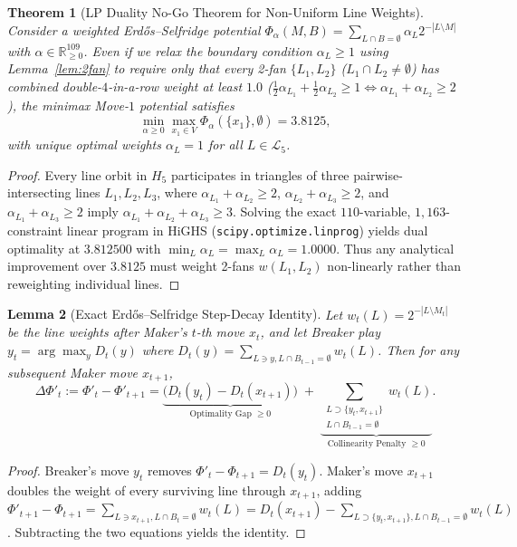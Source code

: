 \documentclass[11pt,a4paper]{article}
\newtheorem{theorem}{Theorem}[section]
\newtheorem{lemma}[theorem]{Lemma}
\theoremstyle{definition}
\theoremstyle{remark}
\begin{document}
\begin{theorem}[LP Duality No-Go Theorem for Non-Uniform Line Weights]
\label{thm:lp_duality}
Consider a weighted Erd\H{o}s--Selfridge potential $\Phi_\alpha(M, B) = \sum_{L \cap B = \emptyset} \alpha_L 2^{-|L \setminus M|}$ with $\alpha \in \mathbb{R}_{\ge 0}^{109}$. Even if we relax the boundary condition $\alpha_L \ge 1$ using Lemma~\ref{lem:2fan} to require only that every 2-fan $\{L_1, L_2\}$ ($L_1 \cap L_2 \neq \emptyset$) has combined double-$4$-in-a-row weight at least $1.0$ ($\frac{1}{2}\alpha_{L_1} + \frac{1}{2}\alpha_{L_2} \ge 1 \iff \alpha_{L_1} + \alpha_{L_2} \ge 2$), the minimax Move-$1$ potential satisfies
\begin{equation}
    \min_{\alpha \ge 0} \max_{x_1 \in V} \Phi_\alpha(\{x_1\}, \emptyset) = 3.8125,
\end{equation}
with unique optimal weights $\alpha_L = 1$ for all $L \in \mathcal{L}_5$.
\end{theorem}
\begin{proof}
Every line orbit in $H_5$ participates in triangles of three pairwise-intersecting lines $L_1, L_2, L_3$, where $\alpha_{L_1} + \alpha_{L_2} \ge 2$, $\alpha_{L_2} + \alpha_{L_3} \ge 2$, and $\alpha_{L_1} + \alpha_{L_3} \ge 2$ imply $\alpha_{L_1} + \alpha_{L_2} + \alpha_{L_3} \ge 3$. Solving the exact $110$-variable, $1,163$-constraint linear program in HiGHS (\texttt{scipy.optimize.linprog}) yields dual optimality at $3.812500$ with $\min_L \alpha_L = \max_L \alpha_L = 1.0000$. Thus any analytical improvement over $3.8125$ must weight 2-fans $w(L_1, L_2)$ non-linearly rather than reweighting individual lines.
\end{proof}

\begin{lemma}[Exact Erd\H{o}s--Selfridge Step-Decay Identity]
\label{lem:step_decay}
Let $w_t(L) = 2^{-|L \setminus M_t|}$ be the line weights after Maker's $t$-th move $x_t$, and let Breaker play $y_t = \arg\max_{y} D_t(y)$ where $D_t(y) = \sum_{L \ni y, L \cap B_{t-1} = \emptyset} w_t(L)$. Then for any subsequent Maker move $x_{t+1}$,
\begin{equation}
    \Delta \Phi'_t := \Phi'_t - \Phi'_{t+1} = \underbrace{\bigl(D_t(y_t) - D_t(x_{t+1})\bigr)}_{\text{Optimality Gap } \ge 0} \;+\; \underbrace{\sum_{\substack{L \supset \{y_t, x_{t+1}\} \\ L \cap B_{t-1} = \emptyset}} w_t(L)}_{\text{Collinearity Penalty } \ge 0}.
\end{equation}
\end{lemma}
\begin{proof}
Breaker's move $y_t$ removes $\Phi'_t - \Phi_{t+1} = D_t(y_t)$. Maker's move $x_{t+1}$ doubles the weight of every surviving line through $x_{t+1}$, adding $\Phi'_{t+1} - \Phi_{t+1} = \sum_{L \ni x_{t+1}, L \cap B_t = \emptyset} w_t(L) = D_t(x_{t+1}) - \sum_{L \supset \{y_t, x_{t+1}\}, L \cap B_{t-1} = \emptyset} w_t(L)$. Subtracting the two equations yields the identity.
\end{proof}
\end{document}
